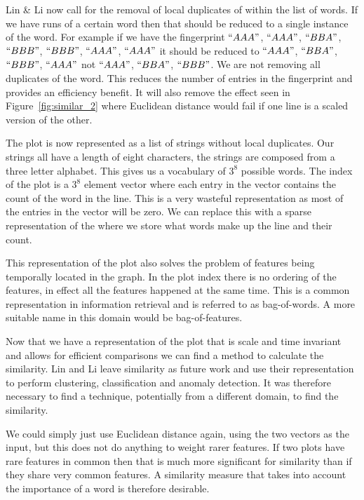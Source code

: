 Lin \& Li now call for the removal of local duplicates of within the list of words.  If we have runs of a certain word then that should be reduced to a single instance of the word.  For example if we have the fingerprint $``AAA"$, $``AAA"$, $``BBA"$, $``BBB"$, $``BBB"$, $``AAA"$, $``AAA"$ it should be reduced to $``AAA"$, $``BBA"$, $``BBB"$, $``AAA"$ not $``AAA"$, $``BBA"$, $``BBB"$.  We are not removing all duplicates of the word.  This reduces the number of entries in the fingerprint and provides an efficiency benefit.  It will also remove the effect seen in Figure~\ref{fig:similar_2} where Euclidean distance would fail if one line is a scaled version of the other.

The plot is now represented as a list of strings without local duplicates.  Our strings all have a length of eight characters, the strings are composed from a three letter alphabet.  This gives us a vocabulary of $3^8$ possible words.  The index of the plot is a $3^8$ element vector where each entry in the vector contains the count of the word in the line.  This is a very wasteful representation as most of the entries in the vector will be zero.  We can replace this with a sparse representation of the where we store what words make up the line and their count.

This representation of the plot also solves the problem of features being temporally located in the graph.  In the plot index there is no ordering of the features, in effect all the features happened at the same time.  This is a common representation in information retrieval and is referred to as bag-of-words.  A more suitable name in this domain would be bag-of-features.

Now that we have a representation of the plot that is scale and time invariant and allows for efficient comparisons we can find a method to calculate the similarity.  Lin and Li leave similarity as future work and use their representation to perform clustering, classification and anomaly detection.  It was therefore necessary to find a technique, potentially from a different domain, to find the similarity.

We could simply just use Euclidean distance again, using the two vectors as the input, but this does not do anything to weight rarer features.  If two plots have rare features in common then that is much more significant for similarity than if they share very common features.  A similarity measure that takes into account the importance of a word is therefore desirable.

